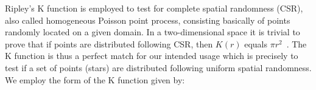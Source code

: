 \documentclass{aa}
\begin{document}
 Ripley's K function is employed to test for complete spatial randomness (CSR),
 also called homogeneous Poisson point process, consisting basically of
 points randomly located on a given domain. In a two-dimensional space it is
 trivial to prove that if points are distributed following CSR, then $K(r)$
 equals $\pi r^2$~\citep{Streib_2011}.
 The K function is thus a perfect match for our intended usage which is
 precisely to test if a set of points (stars) are distributed following
 uniform spatial randomness.
 We employ the form of the K function given by:





\end{document}
